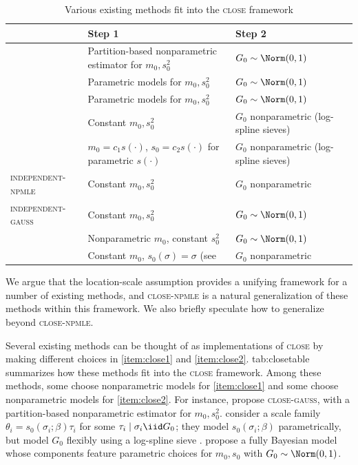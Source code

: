 \documentclass[12pt, reqno]{amsart}
\newcommand{\indepnpmle}{\textsc{independent-npmle}}
\newcommand{\close}{\textsc{close}}
\newcommand{\npmle}{\textsc{npmle}}
\newcommand{\closenpmle}{\close-\npmle}
\newcommand{\closegauss}{\close-\textsc{gauss}}
\newcommand{\indepgauss}{\textsc{independent-gauss}}
\numberwithin{equation}{section}
\begin{document}
\begin{table}[tb]
  \caption{Various existing methods fit into the \close{} framework}
  \label{tab:closetable}
  \centering
\scriptsize
  \begin{tabularx}{\textwidth}{m{}XX}
\toprule
 & Step 1 & Step 2 \\ \midrule
\citet{weinstein2018group} & Partition-based nonparametric estimator for $m_0, s_0^2$ &
$G_0 \sim \Norm
(0,1)$ \\ 
\citet{george2017mortality} & Parametric models for $m_0, s_0^2$ & $G_0 \sim \Norm(0,1)$
\\
\citet{chamberlain1984panel} & Parametric models for $m_0,
s_0^2$ & $G_0 \sim \Norm(0,1)$ \\ 
\citet{efron2016empirical} & Constant $m_0, s_0^2$ & $G_0$ nonparametric (log-spline sieves)
\\
\citet{kline2023discrimination} & $m_0 = c_1 s(\cdot)$, $s_0 = c_2 s(\cdot)$ for
 parametric $s(\cdot)$ & $G_0$ nonparametric (log-spline sieves) \\
\indepnpmle & Constant $m_0, s_0^2$ & $G_0$ nonparametric \\
\indepgauss & Constant $m_0, s_0^2$ & $G_0 \sim \Norm(0,1)$ \\ 
\citet{ignatiadis2019covariate} & Nonparametric $m_0$, constant $s_0^2$ & $G_0 \sim \Norm
(0,1)$ \\
\citet{jiang2010empirical} & Constant $m_0$, $s_0(\sigma) = \sigma$ 
(see \cref
 {rmk:alts_to_close}) & $G_0$ nonparametric
\\\bottomrule
  \end{tabularx}
\end{table}



We argue that the location-scale assumption provides a unifying framework for a number of
existing methods, and \closenpmle{} is a natural generalization of these methods within
this framework. We also briefly speculate how to generalize beyond \closenpmle.

Several existing methods can be thought of as implementations of
\close{} by making different choices in \cref{item:close1} and \cref{item:close2}. \Cref 
{tab:closetable} summarizes how these methods fit into the \close{} framework. Among these
methods, some choose nonparametric models for \cref{item:close1} and some choose
nonparametric models for \cref{item:close2}. For instance, \citet{weinstein2018group}
propose
\closegauss, with a partition-based nonparametric estimator for $m_0, s_0^2$. 
\citet{kline2023discrimination} consider a scale family $\theta_i = s_0(\sigma_i; \beta)
\tau_i$ for some
$\tau_i \mid \sigma_i \iid G_0$; they model $s_0(\sigma_i; \beta)$ parametrically, but
model $G_0$
flexibly using a log-spline sieve \citep{efron2016empirical}. 
\citet{george2017mortality} propose a fully Bayesian model whose components feature
parametric choices for $m_0, s_0$ with $G_0 \sim \Norm(0,1)$.
\end{document}

